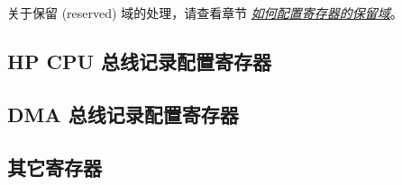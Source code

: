 \documentclass[main\_\_CN.tex]{subfiles}
\begin{document}
关于保留 (reserved) 域的处理，请查看章节 \hyperref[programming-reserved-field]{\textit{如何配置寄存器的保留域}}。


\subsection{HP CPU 总线记录配置寄存器}
\label{sec:dbgassist-spm-mem-monitor-reg}




\subsection{DMA 总线记录配置寄存器}
\label{sec:dbgassist-l2-mem-monitor-reg}




\subsection{其它寄存器}
\label{sec:dbgassist-bus-monitor-reg}


\end{document}
